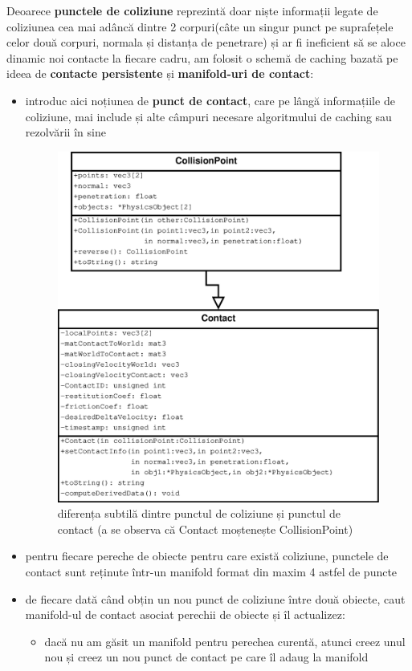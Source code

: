 \documentclass[12pt,a4paper]{report}
\begin{document}
Deoarece \textbf{punctele de coliziune} reprezintă doar niște informații legate de coliziunea cea mai adâncă dintre 2 corpuri(câte un singur punct pe suprafețele celor două corpuri, normala și distanța de penetrare) și ar fi ineficient să se aloce dinamic noi contacte la fiecare cadru, am folosit o schemă de caching bazată pe ideea de \textbf{contacte persistente} și \textbf{manifold-uri de contact}:
\begin{itemize}
	\item introduc aici noțiunea de \textbf{punct de contact}, care pe lângă informațiile de coliziune, mai include și alte câmpuri necesare algoritmului de caching sau rezolvării în sine
	\begin{figure}[H]
		\centering
		\includegraphics[width=0.7\linewidth]{pics/collisionContact.eps}
		\caption[]{\centering diferența subtilă dintre punctul de coliziune și punctul de contact \newline (a se observa că Contact moștenește CollisionPoint)}
		\label{fig:collisionContact}
	\end{figure}
	\item pentru fiecare pereche de obiecte pentru care există coliziune, punctele de contact sunt reținute într-un manifold format din maxim 4 astfel de puncte
	\item de fiecare dată când obțin un nou punct de coliziune între două obiecte, caut manifold-ul de contact asociat perechii de obiecte și îl actualizez:
	\begin{itemize}
		\item dacă nu am găsit un manifold pentru perechea curentă, atunci creez unul nou și creez un nou punct de contact pe care îl adaug la manifold

\end{itemize}
\end{itemize}
\end{document}
